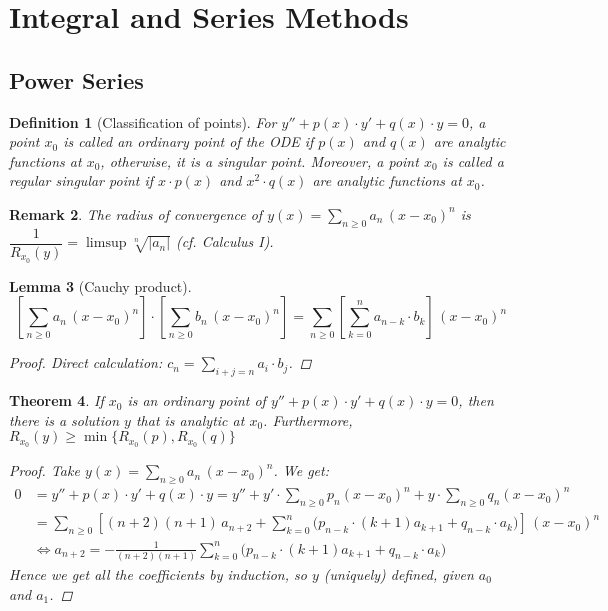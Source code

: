 \documentclass[12pt]{article}
\newtheorem{theorem}{Theorem}[subsection]
\newtheorem{definition}[theorem]{Definition}
\newtheorem{lemma}[theorem]{Lemma}
\newtheorem{remark}[theorem]{Remark}
\begin{document}
\pagebreak

\section{Integral and Series Methods}

\subsection{Power Series}

\begin{definition}[Classification of points]
  For $y''+p(x)\cdot y'+q(x)\cdot y=0$, a point $x_0$ is called an ordinary point of the ODE if $p(x)$ and $q(x)$ are analytic functions at $x_0$, otherwise, it is a singular point. Moreover, a point $x_0$ is called a regular singular point if $x\cdot p(x)$ and $x^2\cdot q(x)$ are analytic functions at $x_0$.
\end{definition}

\begin{remark}
  The radius of convergence of $y(x)=\sum_{n\geq 0}a_n\,(x-x_0)^n$ is $\dfrac{1}{R_{x_0}(y)}=\limsup\sqrt[n]{|a_n|}$ (cf. Calculus I).
\end{remark}

\begin{lemma}[Cauchy product]
  $$\left[\sum_{n\geq 0}a_n\,(x-x_0)^n\right]\cdot \left[\sum_{n\geq 0}b_n\,(x-x_0)^n\right]=\sum_{n\geq 0}\left[\sum_{k=0}^n a_{n-k}\cdot b_k\right]\,(x-x_0)^n$$
  \begin{proof}
    Direct calculation: $c_n=\sum_{i+j=n}a_i\cdot b_j$.
  \end{proof}
\end{lemma}

\begin{theorem}
  If $x_0$ is an ordinary point of $y''+p(x)\cdot y'+q(x)\cdot y=0$, then there is a solution $y$ that is analytic at $x_0$. Furthermore, $R_{x_0}(y)\geq\min\{R_{x_0}(p),R_{x_0}(q)\}$
  \begin{proof}
    Take $y(x)=\sum_{n\geq 0}a_n\,(x-x_0)^n$. We get:
    \begin{align*}
      0&=y''+p(x)\cdot y'+q(x)\cdot y=y''+y'\cdot\sum_{n\geq 0}p_n(x-x_0)^n+y\cdot\sum_{n\geq 0}q_n(x-x_0)^n\\
      &=\sum_{n\geq 0} \left[(n+2)(n+1)\,a_{n+2}+\sum_{k=0}^n\Big(p_{n-k}\cdot (k+1)a_{k+1}+q_{n-k}\cdot a_k\Big)\right]\,(x-x_0)^n\\
      &\Leftrightarrow a_{n+2}=-\frac{1}{(n+2)(n+1)}\sum_{k=0}^n\Big(p_{n-k}\cdot (k+1)a_{k+1}+q_{n-k}\cdot a_k\Big)
    \end{align*}
    Hence we get all the coefficients by induction, so $y$ (uniquely) defined, given $a_0$ and $a_1$.
  \end{proof}
\end{theorem}
\end{document}
